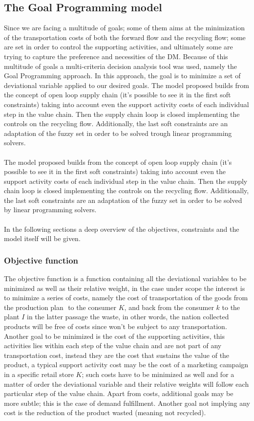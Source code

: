\begin{doublespace}
\subsection{The Goal Programming model}
Since we are facing a multitude of goals; some of them aims at the minimization of the transportation costs of both the forward flow and the recycling flow; some are set in order to control the supporting activities, and ultimately some are trying to capture the preference and necessities of the DM.
Because of this multitude of goals a multi-criteria decision analysis tool was used, namely the Goal Programming approach. In this approach, the goal is to minimize a set of deviational variable applied to our desired goals.
The model proposed builds from the concept of open loop supply chain (it's possible to see it in the first soft constraints) taking into account even the support activity costs of each individual step in the value chain. Then the supply chain loop is closed implementing the controls on the recycling flow. Additionally, the last soft constraints are an adaptation of the fuzzy set in order to be solved trough linear programming solvers.
\\
\\
The model proposed builds from the concept of open loop supply chain (it's possible to see it in the first soft constraints) taking into account even the support activity costs of each individual step in the value chain. Then the supply chain loop is closed implementing the controls on the recycling flow. Additionally, the last soft constraints are an adaptation of the fuzzy set in order to be solved by linear programming solvers.
\\
\\
In the following sections a deep overview of the objectives, constraints and the model itself will be given.

\subsubsection{Objective function}
The objective function is a function containing all the deviational variables to be minimized as well as their relative weight, in the case under scope the interest is to minimize a series of costs, namely the cost of transportation of the goods from the production plan $ $ to the consumer $K$, and back from the consumer $k$ to the plant $I$ in the latter passage the waste, in other words, the nation collected products will be free of costs since won't be subject to any transportation. Another goal to be minimized is the cost of the supporting activities, this activities lies within each step of the value chain and are not part of any transportation cost, instead they are the cost that sustains the value of the product, a typical support activity cost may be the cost of a marketing campaign in a specific retail store $K$; such costs have to be minimized as well and for a matter of order the deviational variable and their relative weights will follow each particular step of the value chain. Apart from costs, additional goals may be more subtle; this is the case of demand fulfillment. Another goal not implying any cost is the reduction of the product wasted (meaning not recycled).


\end{doublespace}
